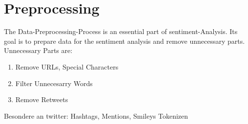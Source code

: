 \section{Preprocessing}
The Data-Preprocessing-Process is an essential part of sentiment-Analysis. Its goal is to prepare data
for the sentiment analysis and remove unnecessary parts.\autocite{Hemalatha2012}
Unnecessary Parts are:\autocite{Hemalatha2012}
\begin{enumerate}
    \item Remove URLs, Special Characters
    \item Filter Unnecesarry Words
    \item Remove Retweets
\end{enumerate}
Besondere an twitter: Hashtags, Mentions, Smileys
Tokenizen